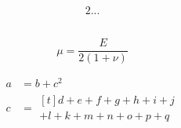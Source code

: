 \documentclass{article}
\begin{document}
\begin{alignat}{2}
  ...
\end{alignat}

\begin{equation}\label{eq:elas:C}
\end{equation}

\begin{equation}
  \mu     = \frac{E    }{2(1+\nu)        }
\end{equation}

\begin{align}
  a & = b + c^2 \\
  c & =
      \begin{multlined}[t]
        d + e + f + g + h + i + j \\
        + l + k + m + n + o + p + q
      \end{multlined}
\end{align}
\end{document}
